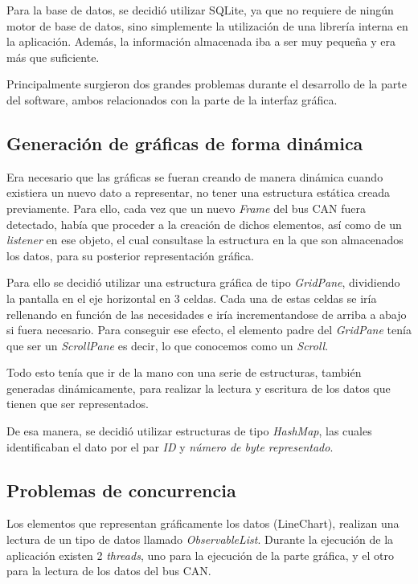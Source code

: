 Para la base de datos, se decidió utilizar SQLite, ya que no requiere de ningún motor de base de datos, sino simplemente la utilización de una librería interna en la aplicación. Además, la información almacenada iba a ser muy pequeña y era más que suficiente.

Principalmente surgieron dos grandes problemas durante el desarrollo de la parte del software, ambos relacionados con la parte de la interfaz gráfica.

\subsection{Generación de gráficas de forma dinámica}\label{generacion_de_graficas_de_forma_dinamica}

Era necesario que las gráficas se fueran creando de manera dinámica cuando existiera un nuevo dato a representar, no tener una estructura estática creada previamente. Para ello, cada vez que un nuevo \emph{Frame} del bus CAN fuera detectado, había que proceder a la creación de dichos elementos, así como de un \emph{listener} en ese objeto, el cual consultase la estructura en la que son almacenados los datos, para su posterior representación gráfica.

Para ello se decidió utilizar una estructura gráfica de tipo \emph{GridPane}, dividiendo la pantalla en el eje horizontal en 3 celdas. Cada una de estas celdas se iría rellenando en función de las necesidades e iría incrementandose de arriba a abajo si fuera necesario. Para conseguir ese efecto, el elemento padre del \emph{GridPane} tenía que ser un \emph{ScrollPane} es decir, lo que conocemos como un \emph{Scroll}.

Todo esto tenía que ir de la mano con una serie de estructuras, también generadas dinámicamente, para realizar la lectura y escritura de los datos que tienen que ser representados.

De esa manera, se decidió utilizar estructuras de tipo \emph{HashMap}, las cuales identificaban el dato por el par \emph{ID} y \emph{número de byte representado}.

\subsection{Problemas de concurrencia}\label{problemas_de_concurrencia}

Los elementos que representan gráficamente los datos (LineChart), realizan una lectura de un tipo de datos llamado \emph{ObservableList}. Durante la ejecución de la aplicación existen 2 \emph{threads}, uno para la ejecución de la parte gráfica, y el otro para la lectura de los datos del bus CAN.

